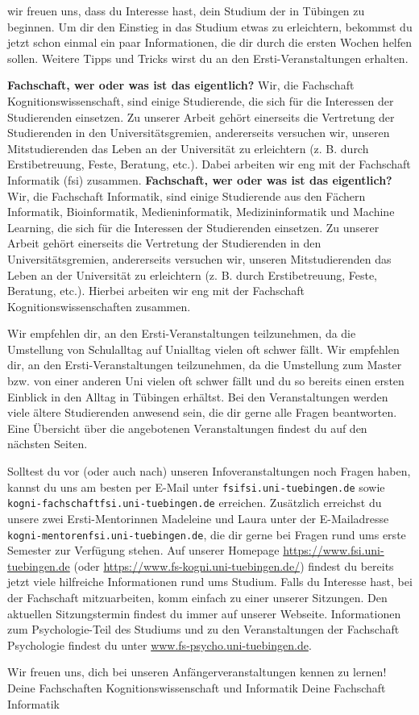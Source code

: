 wir freuen uns, dass du Interesse hast, dein Studium der \studiengang in Tübingen zu beginnen.
Um dir den Einstieg in das Studium etwas zu erleichtern, bekommst du jetzt schon einmal
ein paar Informationen, die dir durch die ersten Wochen helfen sollen.
Weitere Tipps und Tricks wirst du an den Ersti-Veranstaltungen erhalten.


\ifkogwiss
\textbf{\glqq Fachschaft\grqq, wer oder was ist das eigentlich?} Wir, die Fachschaft Kognitionswissenschaft, sind einige Studierende, die sich für die Interessen der Studierenden einsetzen. Zu unserer Arbeit
gehört einerseits die Vertretung der Studierenden in den Universitätsgremien, andererseits versuchen wir, unseren
Mitstudierenden das Leben an der Universität zu erleichtern (z. B. durch Erstibetreuung, Feste,
Beratung, etc.). Dabei arbeiten wir eng mit der Fachschaft Informatik (fsi) zusammen.
\else
\textbf{\glqq Fachschaft\grqq, wer oder was ist das eigentlich?} Wir, die Fachschaft Informatik, sind einige Studierende aus den Fächern
Informatik, Bioinformatik, Medieninformatik, Medizininformatik und Machine Learning, die sich für die Interessen der Studierenden einsetzen. Zu unserer Arbeit
gehört einerseits die Vertretung der Studierenden in den Universitätsgremien, andererseits versuchen wir, unseren
Mitstudierenden das Leben an der Universität zu erleichtern (z. B. durch Erstibetreuung, Feste, Beratung, etc.). Hierbei arbeiten wir eng mit der Fachschaft Kognitionswissenschaften zusammen.
\fi

\ifbachelor 
Wir empfehlen dir, an den Ersti-Veranstaltungen teilzunehmen, da die Umstellung von Schulalltag
auf Unialltag vielen oft schwer fällt. 
\fi
\ifmaster
Wir empfehlen dir, an den Ersti-Veranstaltungen teilzunehmen, da die Umstellung zum Master bzw. von einer anderen Uni vielen oft schwer fällt und du so bereits einen ersten Einblick in den Alltag in Tübingen erhältst.
\fi 
Bei den Veranstaltungen werden viele ältere Studierenden
anwesend sein, die dir gerne alle Fragen beantworten. Eine Übersicht über die angebotenen
Veranstaltungen findest du auf den nächsten Seiten.

Solltest du vor (oder auch nach) unseren Infoveranstaltungen noch Fragen haben, kannst du uns
am besten per E-Mail unter \texttt{fsi\At fsi.uni-tuebingen.de}
\ifkogwiss
sowie \texttt{kogni-fachschaft\At fsi.uni-tuebingen.de}
\fi
erreichen.
\ifkogwiss
Zusätzlich erreichst du unsere zwei Ersti-Mentorinnen Madeleine und Laura unter der E-Mailadresse \texttt{kogni-mentoren\At fsi.uni-tuebingen.de}, die dir gerne bei Fragen rund ums erste Semester zur Verfügung stehen.
\fi
Auf unserer Homepage \mbox{\url{https://www.fsi.uni-tuebingen.de}} (oder \mbox{\url{https://www.fs-kogni.uni-tuebingen.de/}}) findest du bereits
jetzt viele hilfreiche Informationen rund ums Studium. Falls du Interesse hast, bei der Fachschaft mitzuarbeiten,
komm einfach zu einer unserer Sitzungen. Den aktuellen Sitzungstermin findest du immer auf unserer Webseite.
\ifkogwiss  Informationen zum Psychologie-Teil des Studiums und zu den Veranstaltungen der
Fachschaft Psychologie findest du unter \url{www.fs-psycho.uni-tuebingen.de}.\fi

Wir freuen uns, dich bei unseren Anfängerveranstaltungen kennen zu lernen!\\
\ifkogwiss
Deine Fachschaften Kognitionswissenschaft und Informatik
\else
Deine Fachschaft Informatik
\fi
\vfill
